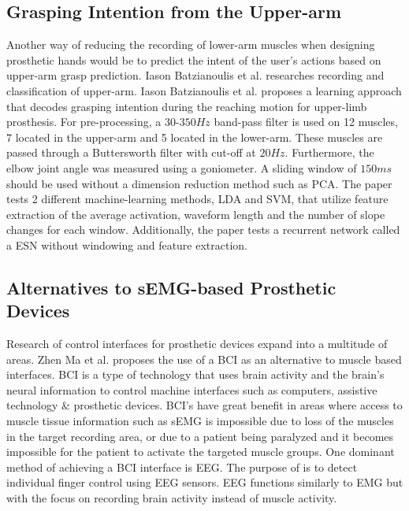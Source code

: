 \documentclass[../main.tex]{subfiles}
\begin{document}
\subsection{Grasping Intention from the Upper-arm}

Another way of reducing the recording of lower-arm muscles when designing prosthetic hands would be to predict the intent of the user's actions based on upper-arm grasp prediction.
Iason Batzianoulis et al. \cite{Batzianoulis2018} researches recording and classification of upper-arm.
Iason Batzianoulis et al. proposes a learning approach that decodes grasping intention during the reaching motion for upper-limb prosthesis.
For pre-processing, a $30$-$350Hz$ band-pass filter is used on 12 muscles, 7 located in the upper-arm and 5 located in the lower-arm.
These muscles are passed through a Buttersworth filter with cut-off at $20Hz$.
Furthermore, the elbow joint angle was measured using a \gls{goniometer}.
A sliding window of $150ms$ should be used without a dimension reduction method such as \gls{PCA}.
The paper tests 2 different machine-learning methods, \gls{LDA} and \gls{SVM}, that utilize feature extraction of the average activation, waveform length and the number of slope changes for each window.
Additionally, the paper tests a recurrent network called a \gls{ESN} without windowing and feature extraction.

\subsection{Alternatives to sEMG-based Prosthetic Devices}

Research of control interfaces for prosthetic devices expand into a multitude of areas.
Zhen Ma et al. \cite{fnins2016} proposes the use of a \gls{BCI} as an alternative to muscle based interfaces.
BCI is a type of technology that uses brain activity and the brain's neural information to control machine interfaces such as computers, assistive technology \& prosthetic devices.
BCI's have great benefit in areas where access to muscle tissue information such as sEMG is impossible due to loss of the muscles in the target recording area, or due to a patient being paralyzed and it becomes impossible for the patient to activate the targeted muscle groups.
One dominant method of achieving a BCI interface is \gls{EEG}.
The purpose of \cite{fnins2016} is to detect individual finger control using EEG sensors. 
EEG functions similarly to EMG but with the focus on recording brain activity instead of muscle activity.
\end{document}

